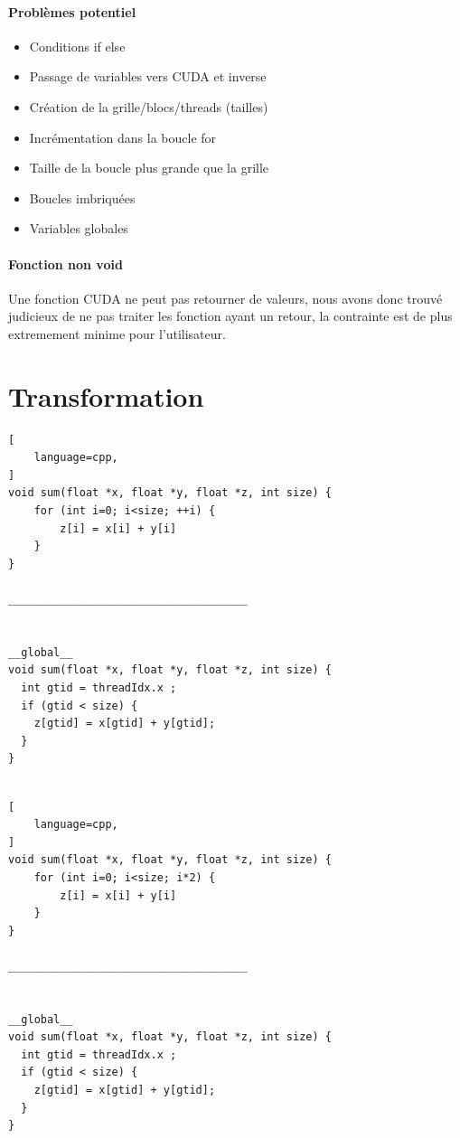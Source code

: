 \documentclass{article}
\begin{document}
	\paragraph{Problèmes potentiel}
		\begin{itemize}
  		\item Conditions if else
  		\item Passage de variables vers CUDA et inverse
  		\item Création de la grille/blocs/threads (tailles)
  		\item Incrémentation dans la boucle for
  		\item Taille de la boucle plus grande que la grille
  		\item Boucles imbriquées
  		\item Variables globales
	
	\end{itemize}
	\paragraph{Fonction non void}
	Une fonction CUDA ne peut pas retourner de valeurs, nous avons donc trouvé judicieux de ne pas traiter les fonction ayant un retour, la contrainte est de plus extremement minime pour l'utilisateur.
	\paragraph{}
	
	\section{Transformation}
	
	\begin{lstlisting}[
    language=cpp,
]
void sum(float *x, float *y, float *z, int size) {
	for (int i=0; i<size; ++i) {
		z[i] = x[i] + y[i]
	}
}

_____________________________________


__global__
void sum(float *x, float *y, float *z, int size) {
  int gtid = threadIdx.x ;
  if (gtid < size) {
    z[gtid] = x[gtid] + y[gtid];
  }
}
	
	\end{lstlisting}

	\begin{lstlisting}[
    language=cpp,
]
void sum(float *x, float *y, float *z, int size) {
	for (int i=0; i<size; i*2) {
		z[i] = x[i] + y[i]
	}
}

_____________________________________


__global__
void sum(float *x, float *y, float *z, int size) {
  int gtid = threadIdx.x ;
  if (gtid < size) {
    z[gtid] = x[gtid] + y[gtid];
  }
}
	
	\end{lstlisting}
\end{document}
